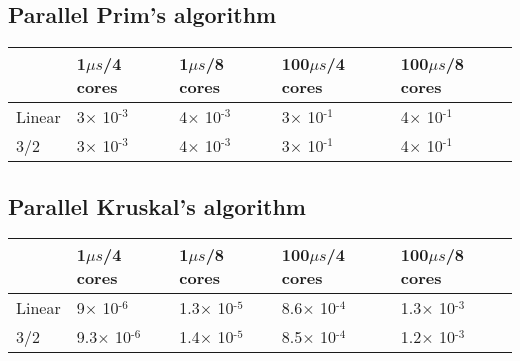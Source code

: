 \documentclass[
10pt, %
a4paper, %
oneside, %
headinclude,footinclude, %
BCOR5mm, %
]{scrartcl}
\begin{document}
\subsection{Parallel Prim's algorithm}
\begin{center}
  \begin{tabular}{|l|l|l|l|l|}
    \hline
    & 1$\mu s$/4 cores & 1$\mu s$/8 cores & 100$\mu s$/4 cores &
                                                                 100$\mu s$/8 cores\\
        \hline
    Linear & 3$\times$ 10\(^{\text{-3}}\) & 4$\times$
                                            10\(^{\text{-3}}\) &
                                                                 3$\times$ 10\(^{\text{-1}}\) & 4$\times$ 10\(^{\text{-1}}\)\\
    \hline    
    3/2 & 3$\times$ 10\(^{\text{-3}}\) & 4$\times$ 10\(^{\text{-3}}\)
                                          & 3$\times$
                                            10\(^{\text{-1}}\) &
                                                                 4$\times$ 10\(^{\text{-1}}\)\\
    \hline    
  \end{tabular}
\end{center}

\subsection{Parallel Kruskal's algorithm}
\begin{center}
  \begin{tabular}{|l|l|l|l|l|}
    \hline
    & 1$\mu s$/4 cores & 1$\mu s$/8 cores & 100$\mu s$/4 cores &
                                                                 100$\mu s$/8 cores\\
    \hline    
    Linear & 9$\times$ 10\(^{\text{-6}}\) & 1.3$\times$
                                            10\(^{\text{-5}}\) &
                                                                 8.6$\times$ 10\(^{\text{-4}}\) & 1.3$\times$ 10\(^{\text{-3}}\)\\
    \hline    
    3/2 & 9.3$\times$ 10\(^{\text{-6}}\) & 1.4$\times$
                                           10\(^{\text{-5}}\) &
                                                                8.5$\times$ 10\(^{\text{-4}}\) & 1.2$\times$ 10\(^{\text{-3}}\)\\
    \hline    
  \end{tabular}
\end{center}
\end{document}
